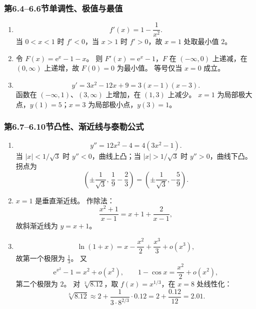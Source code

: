 \documentclass[fontset=fandol]{ctexart}
\newcommand{\ee}{\mathrm{e}}
\begin{document}
\subsubsection*{第6.4--6.6节\quad 单调性、极值与最值}

\begin{enumerate}[label=\textbf{练习\arabic*.},leftmargin=2.2em]
\item
\[
f'(x)=1-\frac1{x^2}.
\]
当 $0<x<1$ 时 $f'<0$，当 $x>1$ 时 $f'>0$，故 $x=1$ 处取最小值 $2$。
\item 令 $F(x)=\ee^x-1-x$。 则 $F'(x)=\ee^x-1$，$F$ 在 $(-\infty,0)$ 上递减，在 $(0,\infty)$ 上递增，故 $F(0)=0$ 为最小值。 等号仅当 $x=0$ 成立。
\item
\[
y'=3x^2-12x+9=3(x-1)(x-3).
\]
函数在 $(-\infty,1)$、$(3,\infty)$ 上增加，在 $(1,3)$ 上减少。 $x=1$ 为局部极大点，$y(1)=5$；$x=3$ 为局部极小点，$y(3)=1$。
\end{enumerate}

\subsubsection*{第6.7--6.10节\quad 凸性、渐近线与泰勒公式}

\begin{enumerate}[label=\textbf{练习\arabic*.},leftmargin=2.2em]
\item
\[
y''=12x^2-4=4(3x^2-1).
\]
当 $|x|<1/\sqrt3$ 时 $y''<0$，曲线上凸；当 $|x|>1/\sqrt3$ 时 $y''>0$，曲线下凸。 拐点为
\[
\left(\pm\frac1{\sqrt3},\,\frac19-\frac23\right)=\left(\pm\frac1{\sqrt3},-\frac59\right).
\]
\item $x=1$ 是垂直渐近线。 作除法：
\[
\frac{x^2+1}{x-1}=x+1+\frac2{x-1},
\]
故斜渐近线为 $y=x+1$。
\item
\[
\ln(1+x)=x-\frac{x^2}{2}+\frac{x^3}{3}+o(x^3),
\]
故第一个极限为 $\frac13$。 又
\[
\ee^{x^2}-1=x^2+o(x^2),\qquad 1-\cos x=\frac{x^2}{2}+o(x^2),
\]
第二个极限为 $2$。 对 $\sqrt[3]{8.12}$，取 $f(x)=x^{1/3}$，在 $x=8$ 处线性化：
\[
\sqrt[3]{8.12}\approx2+\frac{1}{3\cdot 8^{2/3}}\cdot0.12=2+\frac{0.12}{12}=2.01.
\]
\end{enumerate}

\fi
\end{document}
